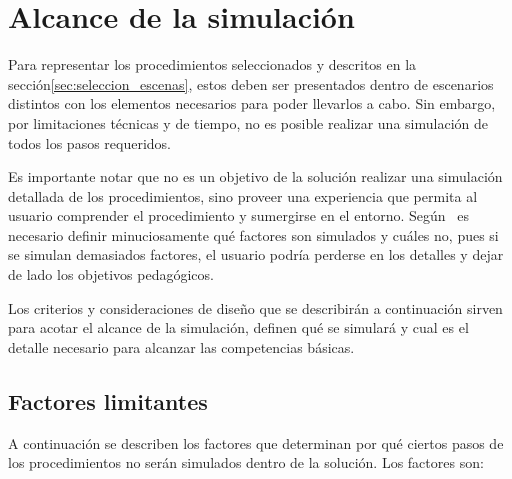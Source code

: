 \section{Alcance de la simulación}
\label{sec:alcance}

Para representar los procedimientos seleccionados y descritos en la
sección\ref{sec:seleccion_escenas}, estos deben ser presentados dentro de
escenarios distintos con los elementos necesarios para poder llevarlos a cabo.
Sin embargo, por limitaciones técnicas y de tiempo, no es posible realizar una
simulación de todos los pasos requeridos.


Es importante notar que no es un objetivo de la solución realizar una simulación
detallada de los procedimientos, sino proveer una experiencia que permita al
usuario comprender el procedimiento y sumergirse en el entorno.
Según~\cite{videojuegos:gonzaleztardon} es necesario definir minuciosamente qué
factores son simulados y cuáles no, pues si se simulan demasiados factores, el
usuario podría perderse en los detalles y dejar de lado los objetivos
pedagógicos. 

Los criterios y consideraciones de diseño que se describirán a continuación
sirven para acotar el alcance de la simulación, definen qué se simulará y cual
es el detalle necesario para alcanzar las competencias básicas.


\subsection{Factores limitantes}

A continuación se describen los factores que determinan por qué ciertos pasos
de los procedimientos no serán simulados dentro de la solución. Los factores son:


